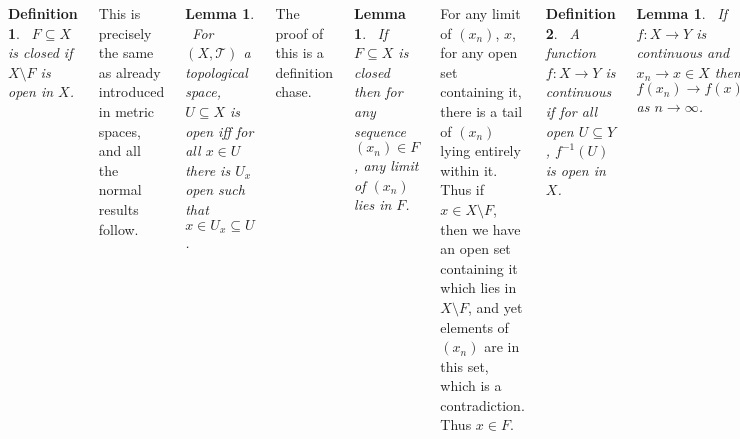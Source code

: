 \documentclass{tikzposter} %
\newtheorem{lemma}[theorem]{Lemma}
\newtheorem{definition}{Definition}
\begin{document}
\begin{columns}
{  \begin{definition}
  \ $F \subseteq X$ is closed if $X \setminus F$ is open in $X$.
  \end{definition}
  \hphantom{}

  This is precisely the same as already introduced in metric spaces, and all the normal results follow. \\


  \begin{lemma}
  \ For $(X, \mathcal{T})$ a topological space, $U \subseteq X$ is open iff for all $x \in U$ there is $U_{x}$ open such that $x \in U_{x} \subseteq U$.
  \end{lemma}
  \hphantom{}

  The proof of this is a definition chase. \\

  \begin{lemma}
  \ If $F \subseteq X$ is closed then for any sequence $(x_{n}) \in F$, any limit of $(x_{n})$ lies in $F$.
  \end{lemma}
  \hphantom{}

  For any limit of $(x_{n})$, $x$, for any open set containing it, there is a tail of $(x_{n})$ lying entirely within it. Thus if $x \in X \setminus F$, then we have an open set containing it which lies in $X \setminus F$, and yet elements of $(x_{n})$ are in this set, which is a contradiction. Thus $x \in F$. \\

  \begin{definition}
  \ A function $f : X \to Y$ is continuous if for all open $U \subseteq Y$, $f^{-1}(U)$ is open in $X$.
  \end{definition}
  \hphantom{}

  \begin{lemma}
  \ If $f : X \to Y$ is continuous and $x_{n} \to x \in X$ then $f(x_{n}) \to f(x)$ as $n \to \infty$.
  \end{lemma}
  \hphantom{}

  \begin{definition}
  \ A homeomorphism between topological spaces $X, Y$ is a bijection $f : X \to Y$ such that both $f$ and $f^{-1}$ are continuous.
  \end{definition}
  \hphantom{}

  Equivalently, for $(X, \mathcal{T}_{1})$, $(Y, \mathcal{T}_{2})$ topological spaces, $f : X \to Y$ is a homeomorphism if $f : X \to Y$ is a bijection and the map over $\mathcal{T}_{1} \to \mathcal{T}_{2}$ given by $U \mapsto f(U)$ is a bijection. \\

}
\end{columns}
\end{document}
